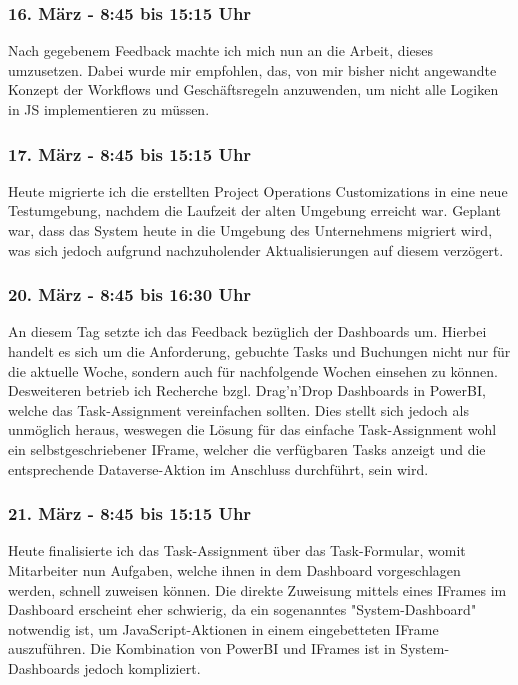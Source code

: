 \subsubsection*{16. März - 8:45 bis 15:15 Uhr} 
Nach gegebenem Feedback machte ich mich nun an die Arbeit, dieses umzusetzen. Dabei wurde mir empfohlen, das, von mir bisher nicht angewandte Konzept der Workflows und Geschäftsregeln anzuwenden, um nicht alle Logiken in JS implementieren zu müssen.

\subsubsection*{17. März - 8:45 bis 15:15 Uhr}
Heute migrierte ich die erstellten Project Operations Customizations in eine neue Testumgebung, nachdem die Laufzeit der alten Umgebung erreicht war. Geplant war, dass das System heute in die Umgebung des Unternehmens migriert wird, was sich jedoch aufgrund nachzuholender Aktualisierungen auf diesem verzögert.

\subsubsection*{20. März - 8:45 bis 16:30 Uhr}
An diesem Tag setzte ich das Feedback bezüglich der Dashboards um. Hierbei handelt es sich um die Anforderung, gebuchte Tasks und Buchungen nicht nur für die aktuelle Woche, sondern auch für nachfolgende Wochen einsehen zu können. Desweiteren betrieb ich Recherche bzgl. Drag'n'Drop Dashboards in PowerBI, welche das Task-Assignment vereinfachen sollten. Dies stellt sich jedoch als unmöglich heraus, weswegen die Lösung für das einfache Task-Assignment wohl ein selbstgeschriebener IFrame, welcher die verfügbaren Tasks anzeigt und die entsprechende Dataverse-Aktion im Anschluss durchführt, sein wird.

\subsubsection*{21. März - 8:45 bis 15:15 Uhr}
Heute finalisierte ich das Task-Assignment über das Task-Formular, womit Mitarbeiter nun Aufgaben, welche ihnen in dem Dashboard vorgeschlagen werden, schnell zuweisen können. Die direkte Zuweisung mittels eines IFrames im Dashboard erscheint eher schwierig, da ein sogenanntes "System-Dashboard" notwendig ist, um JavaScript-Aktionen in einem eingebetteten IFrame auszuführen. Die Kombination von PowerBI und IFrames ist in System-Dashboards jedoch kompliziert.

